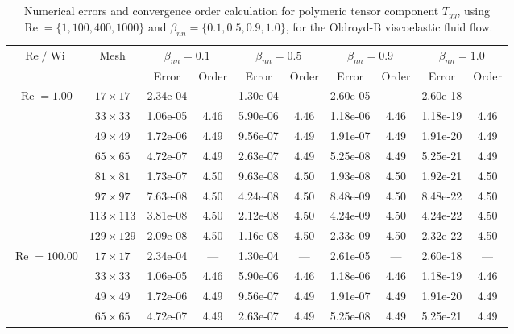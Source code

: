 \documentclass[preprint, 12pt]{elsarticle}
\begin{document}
{\begin{center}
\begin{table}[H]
\caption{Numerical errors and convergence order calculation for polymeric tensor component $T_{yy}$, using $\operatorname{Re}=\{1,100,400,1000\}$ and $\beta_{nn}=\{0.1,0.5,0.9,1.0\}$, for the Oldroyd-B viscoelastic fluid flow.\label{Appendix_tab_OldroydBTyyWi5_10}}
\tiny{
    \begin{tabular*}{\textwidth}{@{\extracolsep\fill}cccccccccc@{}}
    \hline
    \multirow{2}{*}{$\operatorname{Re}/\operatorname{Wi}$} & \multirow{2}{*}{Mesh} & \multicolumn{2}{c}{$\beta_{nn}=0.1$}  & \multicolumn{2}{c}{$\beta_{nn}=0.5$}  & \multicolumn{2}{c}{$\beta_{nn}=0.9$}  & \multicolumn{2}{c}{$\beta_{nn}=1.0$}\\ %
     & & Error & Order & Error & Order & Error & Order & Error & Order \\
    \hline
    \multirow{7}{*}{$\operatorname{Re}=1.00$} & $17\times 17$ & 2.34e-04 & --- & 1.30e-04 & --- & 2.60e-05 & --- & 2.60e-18 & --- \\
    & $33\times 33$ & 1.06e-05 & 4.46 & 5.90e-06 & 4.46 & 1.18e-06 & 4.46 & 1.18e-19 & 4.46 \\
    & $49\times 49$ & 1.72e-06 & 4.49 & 9.56e-07 & 4.49 & 1.91e-07 & 4.49 & 1.91e-20 & 4.49 \\
    \multirow{3}{*}{$\operatorname{Wi}=5$} & $65\times 65$ & 4.72e-07 & 4.49 & 2.63e-07 & 4.49 & 5.25e-08 & 4.49 & 5.25e-21 & 4.49 \\
    & $81\times 81$ & 1.73e-07 & 4.50 & 9.63e-08 & 4.50 & 1.93e-08 & 4.50 & 1.92e-21 & 4.50 \\
    & $97\times 97$ & 7.63e-08 & 4.50 & 4.24e-08 & 4.50 & 8.48e-09 & 4.50 & 8.48e-22 & 4.50 \\
    & $113\times 113$ & 3.81e-08 & 4.50 & 2.12e-08 & 4.50 & 4.24e-09 & 4.50 & 4.24e-22 & 4.50 \\
    & $129\times 129$ & 2.09e-08 & 4.50 & 1.16e-08 & 4.50 & 2.33e-09 & 4.50 & 2.32e-22 & 4.50 \\
    \hline
    \multirow{7}{*}{$\operatorname{Re}=100.00$} & $17\times 17$ & 2.34e-04 & --- & 1.30e-04 & --- & 2.61e-05 & --- & 2.60e-18 & --- \\
    & $33\times 33$ & 1.06e-05 & 4.46 & 5.90e-06 & 4.46 & 1.18e-06 & 4.46 & 1.18e-19 & 4.46 \\
    & $49\times 49$ & 1.72e-06 & 4.49 & 9.56e-07 & 4.49 & 1.91e-07 & 4.49 & 1.91e-20 & 4.49 \\
    \multirow{3}{*}{$\operatorname{Wi}=5$} & $65\times 65$ & 4.72e-07 & 4.49 & 2.63e-07 & 4.49 & 5.25e-08 & 4.49 & 5.25e-21 & 4.49 \\

\end{tabular*}}
\end{table}
\end{center}}
\end{document}
